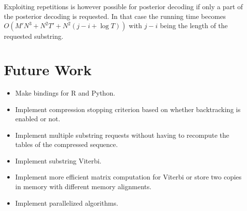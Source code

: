 Exploiting repetitions is however possible for posterior decoding if only a
part of the posterior decoding is requested. In that case the running time
becomes $O(M' N^3 + N^2 T' + N^2 (j - i + \log T))$ with $j - i$ being the
length of the requested substring.

\section{Future Work}

\begin{itemize}
\item Make bindings for R and Python.
\item Implement compression stopping criterion based on whether backtracking is
  enabled or not.
\item Implement multiple substring requests without having to recompute the
  tables of the compressed sequence.
\item Implement substring Viterbi.
\item Implement more efficient matrix computation for Viterbi or store two
  copies in memory with different memory alignments.
\item Implement parallelized algorithms.
\end{itemize}

